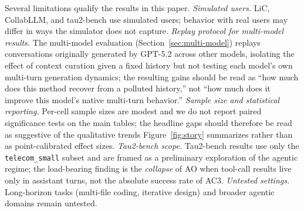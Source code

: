 \documentclass{article}
\newcommand{\method}{AC3\xspace}
\begin{document}
Several limitations qualify the results in this paper. \emph{Simulated users.} LiC, CollabLLM, and tau2-bench use simulated users; behavior with real users may differ in ways the simulator does not capture. \emph{Replay protocol for multi-model results.} The multi-model evaluation (Section~\ref{sec:multi-model}) replays conversations originally generated by GPT-5.2 across other models, isolating the effect of context curation given a fixed history but not testing each model's own multi-turn generation dynamics; the resulting gains should be read as ``how much does this method recover from a polluted history,'' not ``how much does it improve this model's native multi-turn behavior.'' \emph{Sample size and statistical reporting.} Per-cell sample sizes are modest and we do not report paired significance tests on the main tables; the headline gaps should therefore be read as suggestive of the qualitative trends Figure~\ref{fig:story} summarizes rather than as point-calibrated effect sizes. \emph{Tau2-bench scope.} Tau2-bench results use only the \texttt{telecom\_small} subset and are framed as a preliminary exploration of the agentic regime; the load-bearing finding is the \emph{collapse} of AO when tool-call results live only in assistant turns, not the absolute success rate of \method. \emph{Untested settings.} Long-horizon tasks (multi-file coding, iterative design) and broader agentic domains remain untested.


\newpage

\end{document}
